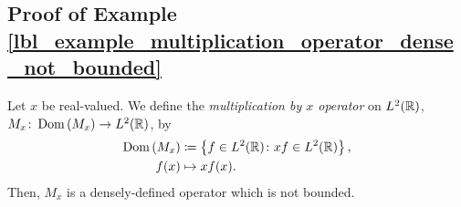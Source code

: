 \subsection{Proof of Example \eqref{lbl_example_multiplication_operator_dense_not_bounded}}\label{proof_lbl_example_multiplication_operator_dense_not_bounded}

\begin{example}
  Let $x$ be real-valued. We define the {\emph{multiplication by $x$ operator}} on $L^2(\mathbb{R})$, $M_x\colon \operatorname{Dom}\left(M_x\right) \to L^2(\mathbb{R})$, by
  \begin{align*}
    \operatorname{Dom}\left(M_x\right) &\coloneqq  \left\{f \in L^2(\mathbb{R}) \colon xf \in L^2(\mathbb{R})\right\}, \\
    f(x) &\mapsto xf(x).
  \end{align*}
  Then, $M_x$ is a densely-defined operator which is not bounded.
\end{example}
